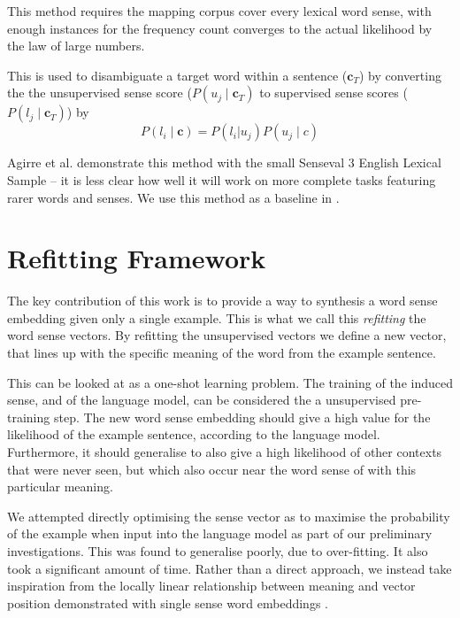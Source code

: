 \documentclass{sig-alternate}
\renewcommand{\c}{\mathbf{c}}
\begin{document}
This method requires the mapping corpus cover every lexical word sense, with enough instances for the frequency count converges to the actual likelihood by the law of large numbers.

This is used to disambiguate a target word within a sentence ($\c_T$)  by converting the the unsupervised sense score ($P(u_j \mid \c_T)$ to supervised sense scores ($P(l_j \mid \c_T)$) by
\begin{equation} \label{eq:agireewsd}
P(l_i \mid \c) = P(l_i | u_j) P(u_j \mid c)
\end{equation}


Agirre et al. demonstrate this method with the small Senseval 3 English Lexical Sample \parencite{mihalcea2004senseval} -- it is less clear how well it will work on more complete tasks featuring rarer words and senses. We use this method as a baseline in .


\section{Refitting Framework} \label{refitting} \label{Framework}

The key contribution of this work is to provide a way to synthesis a word sense embedding given only a single example. This is what we call this \emph{refitting} the word sense vectors. By refitting the unsupervised vectors we define a new vector, that lines up with the specific meaning of the word from the example sentence.

This can be looked at as a one-shot learning problem.
The training of the induced sense, and of the language model, can be considered the a unsupervised pre-training step. The new word sense embedding should give a high value for the likelihood of the example sentence, according to the language model. Furthermore, it should generalise to also give a high likelihood of other contexts that were never seen, but which also occur near the word sense of with this particular meaning.

We attempted directly optimising the sense vector as to maximise the probability of the example when input into the language model as part of our preliminary investigations. This was found to generalise poorly, due to over-fitting. It also took a significant amount of time. Rather than a direct approach, we instead take inspiration from the locally linear relationship between meaning and vector position demonstrated with single sense word embeddings \parencite{mikolov2013efficient,mikolovSkip,mikolov2013linguisticsubstructures}.
\end{document}
